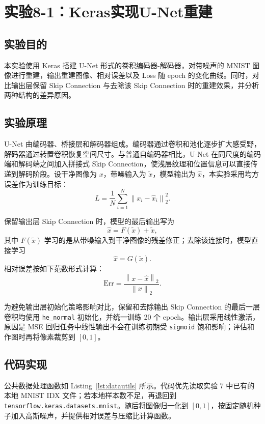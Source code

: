 \documentclass[10.5pt]{config}
\date{\today}
\begin{document}
\makeheader

\section{实验8-1：Keras实现U-Net重建}

\subsection{实验目的}

本实验使用 Keras 搭建 U-Net 形式的卷积编码器-解码器，对带噪声的 MNIST 图像进行重建，输出重建图像、相对误差以及 Loss 随 epoch 的变化曲线。同时，对比输出层保留 Skip Connection 与去除该 Skip Connection 时的重建效果，并分析两种结构的差异原因。

\subsection{实验原理}

U-Net 由编码器、桥接层和解码器组成。编码器通过卷积和池化逐步扩大感受野，解码器通过转置卷积恢复空间尺寸。与普通自编码器相比，U-Net 在同尺度的编码端和解码端之间加入拼接式 Skip Connection，使浅层纹理和位置信息可以直接传递到解码阶段。设干净图像为 $x$，带噪输入为 $\tilde{x}$，模型输出为 $\hat{x}$，本实验采用均方误差作为训练目标：
\[
    L=\frac{1}{N}\sum_{i=1}^{N}\left\|x_i-\hat{x}_i\right\|_2^2 .
\]

保留输出层 Skip Connection 时，模型的最后输出写为
\[
    \hat{x}=F(\tilde{x})+\tilde{x},
\]
其中 $F(\tilde{x})$ 学习的是从带噪输入到干净图像的残差修正；去除该连接时，模型直接学习
\[
    \hat{x}=G(\tilde{x}).
\]
相对误差按如下范数形式计算：
\[
    \mathrm{Err}=\frac{\left\|x-\hat{x}\right\|_2}{\left\|x\right\|_2}.
\]

为避免输出层初始化策略影响对比，保留和去除输出 Skip Connection 的最后一层卷积均使用 \texttt{he\_normal} 初始化，并统一训练 20 个 epoch。输出层采用线性激活，原因是 MSE 回归任务中线性输出不会在训练初期受 \texttt{sigmoid} 饱和影响；评估和作图时再将像素裁剪到 $[0,1]$。

\subsection{代码实现}

公共数据处理函数如 Listing~\ref{lst:datautils} 所示。代码优先读取实验 7 中已有的本地 MNIST IDX 文件；若本地样本数不足，再退回到 \texttt{tensorflow.keras.datasets.mnist}。随后将图像归一化到 $[0,1]$，按固定随机种子加入高斯噪声，并提供相对误差与压缩比计算函数。
\end{document}
